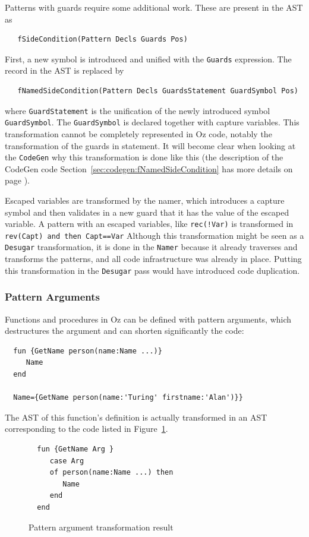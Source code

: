 \documentclass[a4paper]{memoir}
\begin{document}
Patterns with guards require some additional work. These are present in the AST
as 
\begin{lstlisting}
   fSideCondition(Pattern Decls Guards Pos)
\end{lstlisting}
First, a new symbol is
introduced and unified with the \lstinline!Guards! expression. The record in the
AST is replaced by 
\begin{lstlisting}
   fNamedSideCondition(Pattern Decls GuardsStatement GuardSymbol Pos)
\end{lstlisting}
where \lstinline!GuardStatement! is the unification of the newly
introduced symbol \\\lstinline!GuardSymbol!. The \lstinline!GuardSymbol! is
declared together with capture variables. 
This transformation cannot be completely represented in Oz code, notably the
transformation of the guards in statement. It will become clear when looking at
the \lstinline!CodeGen! why this transformation is done like this (the
description of the CodeGen code Section~\ref{sec:codegen:fNamedSideCondition} has more
details on page \pageref{sec:codegen:fNamedSideCondition}).


Escaped variables are transformed by the namer, which introduces a capture
symbol and then validates in a new guard that it has the value of the escaped variable.
 A pattern with an escaped variables, like \lstinline$rec(!Var)$ is
transformed in \lstinline!rev(Capt) and then Capt==Var!
Although this transformation might be seen as a \lstinline!Desugar! transformation, it is
done in the \lstinline!Namer! because it already traverses and transforms the
patterns, and all code infrastructure was already in place. Putting this
transformation in the \lstinline!Desugar! pass would have introduced code duplication.


\subsubsection{Pattern Arguments}
Functions and procedures in Oz can be defined with pattern arguments, which
destructures the argument and can shorten significantly the code:
\begin{lstlisting}
  fun {GetName person(name:Name ...)}
     Name
  end

  Name={GetName person(name:'Turing' firstname:'Alan')}}
\end{lstlisting}

The AST of this function's definition is actually transformed in an AST corresponding to the  code
listed in Figure~\ref{fig:getname2}.
\begin{figure}[h]
\begin{lstlisting}
  fun {GetName Arg }
     case Arg
     of person(name:Name ...) then
        Name
     end
  end
\end{lstlisting}
\caption{Pattern argument transformation result}
\label{fig:getname2}
\end{figure}
\end{document}
